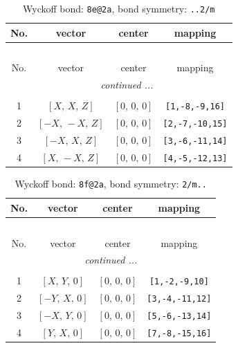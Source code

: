\documentclass[fleqn,8pt]{jsarticle}
\begin{document}
\renewcommand{\arraystretch}{1.2}
\begin{longtable}{cccc}
\caption{Wyckoff bond: {\tt 8e@2a}, bond symmetry: {\tt ..2/m}}
 \\
 \hline \hline
No. & vector & center & mapping \\ \hline \endfirsthead

\multicolumn{3}{l}{\tablename\ \thetable{}} \\
 \hline \hline
No. & vector & center & mapping \\ \hline \endhead

 \hline \hline
\multicolumn{3}{r}{\footnotesize\it continued ...} \\ \endfoot

 \hline \hline
\multicolumn{3}{r}{} \\ \endlastfoot

1 & $\left[ X,\, X,\, Z \right]$ & $\left[ 0,\, 0,\, 0 \right]$ & {\tt [1,-8,-9,16]} \\ \hline
2 & $\left[ - X,\, - X,\, Z \right]$ & $\left[ 0,\, 0,\, 0 \right]$ & {\tt [2,-7,-10,15]} \\ \hline
3 & $\left[ - X,\, X,\, Z \right]$ & $\left[ 0,\, 0,\, 0 \right]$ & {\tt [3,-6,-11,14]} \\ \hline
4 & $\left[ X,\, - X,\, Z \right]$ & $\left[ 0,\, 0,\, 0 \right]$ & {\tt [4,-5,-12,13]} \\
\end{longtable}
\renewcommand{\arraystretch}{1.2}
\begin{longtable}{cccc}
\caption{Wyckoff bond: {\tt 8f@2a}, bond symmetry: {\tt 2/m..}}
 \\
 \hline \hline
No. & vector & center & mapping \\ \hline \endfirsthead

\multicolumn{3}{l}{\tablename\ \thetable{}} \\
 \hline \hline
No. & vector & center & mapping \\ \hline \endhead

 \hline \hline
\multicolumn{3}{r}{\footnotesize\it continued ...} \\ \endfoot

 \hline \hline
\multicolumn{3}{r}{} \\ \endlastfoot

1 & $\left[ X,\, Y,\, 0 \right]$ & $\left[ 0,\, 0,\, 0 \right]$ & {\tt [1,-2,-9,10]} \\ \hline
2 & $\left[ - Y,\, X,\, 0 \right]$ & $\left[ 0,\, 0,\, 0 \right]$ & {\tt [3,-4,-11,12]} \\ \hline
3 & $\left[ - X,\, Y,\, 0 \right]$ & $\left[ 0,\, 0,\, 0 \right]$ & {\tt [5,-6,-13,14]} \\ \hline
4 & $\left[ Y,\, X,\, 0 \right]$ & $\left[ 0,\, 0,\, 0 \right]$ & {\tt [7,-8,-15,16]} \\
\end{longtable}
\end{document}
